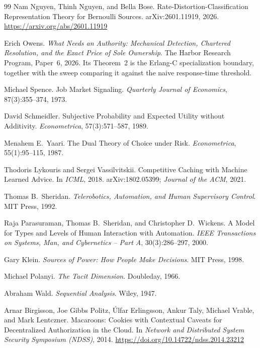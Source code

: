 \documentclass[11pt,a4paper]{article}
\theoremstyle{definition}
\theoremstyle{plain}
\begin{document}
\begin{thebibliography}{99}
Nam Nguyen, Thinh Nguyen, and Bella Bose.
\newblock
Rate-Distortion-Classification Representation Theory for Bernoulli Sources.
\newblock arXiv:2601.11919, 2026.
\url{https://arxiv.org/abs/2601.11919}

Erich Owens.
\newblock \textit{What Needs an Authority: Mechanical Detection, Chartered Resolution, and the Exact Price of Sole Ownership}.
\newblock The Harbor Research Program, Paper~6, 2026. Its Theorem~2 is the Erlang-C
specialization boundary, together with the sweep comparing it against the naive
response-time threshold.

Michael Spence.
\newblock Job Market Signaling.
\newblock \textit{Quarterly Journal of Economics}, 87(3):355--374, 1973.

David Schmeidler.
\newblock Subjective Probability and Expected Utility without Additivity.
\newblock \textit{Econometrica}, 57(3):571--587, 1989.

Menahem E.\ Yaari.
\newblock The Dual Theory of Choice under Risk.
\newblock \textit{Econometrica}, 55(1):95--115, 1987.

Thodoris Lykouris and Sergei Vassilvitskii.
\newblock Competitive Caching with Machine Learned Advice.
\newblock In \textit{ICML}, 2018. arXiv:1802.05399; \textit{Journal of the ACM}, 2021.

Thomas B.\ Sheridan.
\newblock \textit{Telerobotics, Automation, and Human Supervisory Control}.
\newblock MIT Press, 1992.

Raja Parasuraman, Thomas B.\ Sheridan, and Christopher D.\ Wickens.
\newblock A Model for Types and Levels of Human Interaction with Automation.
\newblock \textit{IEEE Transactions on Systems, Man, and Cybernetics -- Part A}, 30(3):286--297, 2000.

Gary Klein.
\newblock \textit{Sources of Power: How People Make Decisions}.
\newblock MIT Press, 1998.

Michael Polanyi.
\newblock \textit{The Tacit Dimension}.
\newblock Doubleday, 1966.

Abraham Wald.
\newblock \textit{Sequential Analysis}.
\newblock Wiley, 1947.

Arnar Birgisson, Joe Gibbs Politz, Úlfar Erlingsson, Ankur Taly, Michael Vrable, and Mark Lentczner.
\newblock Macaroons: Cookies with Contextual Caveats for Decentralized Authorization in the Cloud.
\newblock In \textit{Network and Distributed System Security Symposium (NDSS)}, 2014.
\newblock \url{https://doi.org/10.14722/ndss.2014.23212}

\end{thebibliography}
\end{document}
